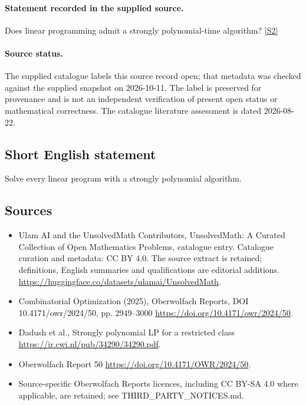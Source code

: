 \documentclass[11pt]{article}
\begin{document}
\paragraph{Statement recorded in the supplied source.}
Does linear programming admit a strongly polynomial-time algorithm? \href{https://doi.org/10.4171/owr/2024/50}{[S2]}
\paragraph{Source status.}
The supplied catalogue labels this source record open; that metadata was checked against the supplied snapshot on 2026-10-11. The label is preserved for provenance and is not an independent verification of present open status or mathematical correctness. The catalogue literature assessment is dated 2026-08-22.
\subsection{Short English statement}
Solve every linear program with a strongly polynomial algorithm.
\subsection{Sources}
\begin{itemize}
\item[S1] Ulam AI and the UnsolvedMath Contributors, UnsolvedMath: A Curated Collection of Open Mathematics Problems, catalogue entry. Catalogue curation and metadata: CC BY 4.0. The source extract is retained; definitions, English summaries and qualifications are editorial additions.
\url{https://huggingface.co/datasets/ulamai/UnsolvedMath}.
\item[S2] Combinatorial Optimization (2025), Oberwolfach Reports, DOI 10.4171/owr/2024/50, pp. 2949--3000
\url{https://doi.org/10.4171/owr/2024/50}.
\item[S3] Dadush et al., Strongly polynomial LP for a restricted class
\url{https://ir.cwi.nl/pub/34290/34290.pdf}.
\item[S4] Oberwolfach Report 50
\url{https://doi.org/10.4171/OWR/2024/50}.
\item Source-specific Oberwolfach Reports licences, including CC BY-SA 4.0 where applicable, are retained; see THIRD\_PARTY\_NOTICES.md.
\end{itemize}
\end{document}
